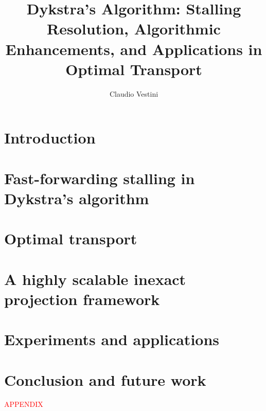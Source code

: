 \documentclass[lof,los,lot,12pt,advisercopy]{puseniorthesis}
\author{Claudio Vestini}
\title{Dykstra's Algorithm: Stalling Resolution, Algorithmic Enhancements, and Applications in Optimal Transport}
\numberwithin{equation}{section}
\begin{document}


\chapter{Introduction} \label{ch:introduction}


\chapter{Fast-forwarding stalling in Dykstra's algorithm} \label{ch:dykstra}









\chapter{Optimal transport} \label{ch:optimal_transport}






\chapter{A highly scalable inexact projection framework} \label{ch:optimisation}







\chapter{Experiments and applications} \label{ch:experiments_and_applications}






\chapter{Conclusion and future work} \label{ch:conclusion}


\clearpage
\printbibliography

\clearpage
\appendix

\textcolor{red}{APPENDIX}
\end{document}
